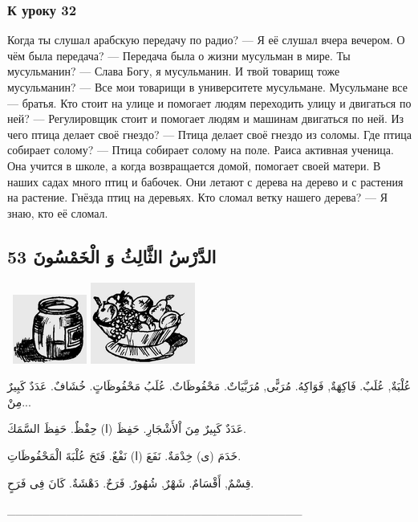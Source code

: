 \documentclass[a5paper]{article}
\begin{document}
\subsubsection{К уроку 32}
Когда ты слушал арабскую передачу по радио? — Я её слушал вчера вечером. О чём была передача? — Передача была о жизни мусульман в мире. Ты мусульманин? — Слава Богу, я мусульманин. И твой товарищ тоже мусульманин? — Все мои товарищи в университете мусульмане. Мусульмане все — братья. Кто стоит на улице и помогает людям переходить улицу и двигаться по ней? — Регулировщик стоит и помогает людям и машинам двигаться по ней. Из чего птица делает своё гнездо? — Птица делает своё гнездо из соломы. Где птица собирает солому? — Птица собирает солому на поле. Раиса активная ученица. Она учится в школе, а когда возвращается домой, помогает своей матери. В наших садах много птиц и бабочек. Они летают с дерева на дерево и с растения на растение. Гнёзда птиц на деревьях. Кто сломал ветку нашего дерева? — Я знаю, кто её сломал.

\subsection{الدَّرْسُ الثَّالِثُ وَ الْخَمْسُونَ 53}
\  \includegraphics[width=0.9583in,height=0.8957in]{MuhammadBagauddinlatinized-img174.png}   \includegraphics[width=1.3543in,height=1.052in]{MuhammadBagauddinlatinized-img175.png} 

عُلْبَةٌ, عُلَبٌ. فَاكِهَةٌ, فَوَاكِهُ. مُرَبًّى, مُرَبَّيَاتٌ. مَحْفُوظَاتٌ. عُلَبُ مَحْفُوظَاتٍ. خُشَافٌ. عَدَدٌ كَبِيرٌ مِنْ... 

عَدَدٌ كَبِيرٌ مِنَ اْلأَشْجَارِ. حَفِظَ (ا) حِفْظٌ. حَفِظَ السَّمَكَ. 

خَدَمَ (ى) خِدْمَةٌ. نَفَعَ (ا) نَفْعٌ. فَتَحَ عُلْبَةَ الْمَحْفُوظَاتِ. 

قِسْمٌ, أَقْسَامٌ. شَهْرٌ, شُهُورٌ. فَرَحٌ. دَهْشَةٌ. كَانَ فِى فَرَحٍ.

\_\_\_\_\_\_\_\_\_\_\_\_\_\_\_\_\_\_\_\_\_\_\_\_\_\_\_\_\_\_\_\_\_\_\_
\end{document}
